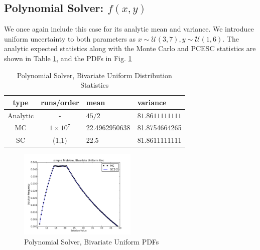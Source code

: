 \subsection{Polynomial Solver: $f(x,y)$}
We once again include this case for its analytic mean and variance.  We introduce uniform uncertainty to both parameters as $x\sim\mathcal{U}(3,7),y\sim\mathcal{U}(1,6)$.  The analytic expected statistics along with the Monte Carlo and PCESC statistics are shown in Table \ref{tab: poly milt res}, and the PDFs in Fig. \ref{fig: poly milt res}
\begin{table}[H]
\begin{center}
\begin{tabular}{c c|l l}
type & runs/order & mean & variance \\ \hline
Analytic & - & $45/2$ & $81.8611111111$ \\
MC & $1\times10^7$ & 22.4962950638 & 81.8754664265 \\
SC & (1,1) & 22.5 & 81.8611111111 \\
\end{tabular}
\end{center}
\caption{Polynomial Solver, Bivariate Uniform Distribution Statistics}
\label{tab: poly milt res}
\end{table}
\begin{figure}[H]
\centering
   \includegraphics[width=0.5\textwidth]{../graphics/poly_2v_uniform_pdfs}
   \caption{Polynomial Solver, Bivariate Uniform PDFs}
      \label{fig: poly milt res}
\end{figure}

